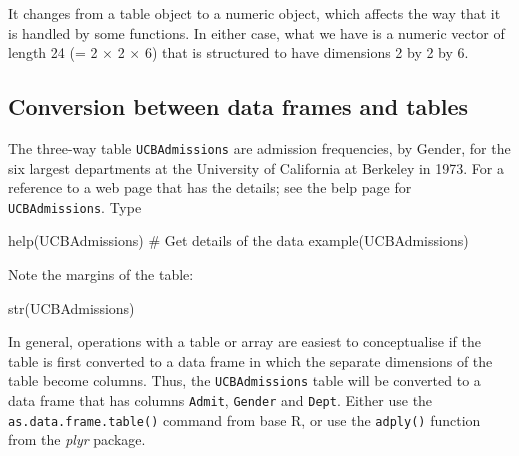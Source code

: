 \documentclass{tufte-book}\usepackage[]{graphicx}\usepackage[]{color}
\newcommand{\txtt}[1]{\texttt{#1}}
\begin{document}
It changes from a table object to a numeric object, which
affects the way that it is handled by some functions.  In
either case, what we have is a numeric vector of length 24
(= 2 $\times$ 2 $\times$ 6) that is structured to have
dimensions 2 by 2 by 6.

\subsection{Conversion between data frames and tables}
The three-way table \txtt{UCBAdmissions} are admission frequencies,
by Gender, for the six largest departments at the University of
California at Berkeley in 1973. For a reference to a web page that
has the details; see the belp page for \txtt{UCBAdmissions}.  Type
\begin{Schunk}
\begin{Sinput}
help(UCBAdmissions)     # Get details of the data
example(UCBAdmissions)
\end{Sinput}
\end{Schunk}
Note the margins of the table:
\begin{fullwidth}
\begin{Schunk}
\begin{Sinput}
str(UCBAdmissions)
\end{Sinput}
\end{Schunk}
\end{fullwidth}

In general, operations with a table or array are easiest to
conceptualise if the table is first converted to a data frame
in which the separate dimensions of the table become columns.
Thus, the \txtt{UCBAdmissions} table will be converted to
a data frame that has columns \txtt{Admit}, \txtt{Gender} and
\txtt{Dept}. Either use the \txtt{as.data.frame.table()}
command from base R, or use the \txtt{adply()} function from
the {\em plyr} package.
\end{document}
